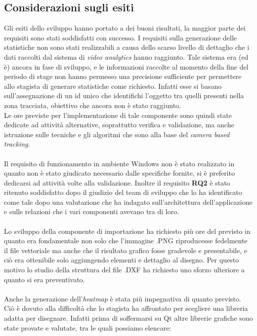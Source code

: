 \documentclass[a4paper,13pt,twoside]{article}
\begin{document}
\subsection{Considerazioni sugli esiti}
Gli esiti dello sviluppo hanno portato a dei buoni risultati, la maggior parte dei requisiti sono stati soddisfatti con successo. I requisiti sulla generazione delle statistiche non sono stati realizzabili a causa dello scarso livello di dettaglio che i dati raccolti dal sistema di \textit{video analytics} hanno raggiunto. Tale sistema era (ed è) ancora in fase di sviluppo, e le informazioni raccolte al momento della fine del periodo di stage non hanno permesso una precisione sufficiente per permettere allo stagista di generare statistiche come richiesto. Infatti esse si basano sull'assegnazione di un id unico che identifichi l'oggetto tra quelli presenti nella zona tracciata, obiettivo che ancora non è stato raggiunto. \\ 
Le ore previste per l'implementazione di tale componente sono quindi state dedicate ad attività alternative, soprattutto verifica e validazione, ma anche istruzione sulle tecniche e gli algoritmi che sono alla base del \textit{camera based tracking}. \\ \\
Il requisito di funzionamento in ambiente Windows non è stato realizzato in quanto non è stato giudicato necessario dalle specifiche fornite, si è preferito dedicarsi ad attività volte alla validazione. Inoltre il requisito \textbf{RQ2} è stato ritenuto soddisfatto dopo il giudizio del team di sviluppo che lo ha identificato come tale dopo una valutazione che ha indagato sull'architettura dell'applicazione e sulle relazioni che i vari componenti avevano tra di loro. \\ \\
Lo sviluppo della componente di importazione ha richiesto più ore del previsto in quanto era fondamentale non solo che l'immagine .PNG riproducesse fedelmente il file vettoriale ma anche che il risultato grafico fosse gradevole e presentabile, e ciò era ottenibile solo aggiungendo elementi e dettaglio al disegno. Per questo motivo lo studio della struttura del file .DXF ha richiesto uno sforzo ulteriore a quanto si era preventivato. \\ \\ 
Anche la generazione dell'\textit{heatmap} è stata più impegnativa di quanto previsto. Ciò è dovuto alla difficoltà che lo stagista ha affrontato per scegliere una libreria adatta per disegnare. Infatti prima di soffermarsi su Qt altre librerie grafiche sono state provate e valutate, tra le quali possiamo elencare:
\end{document}
